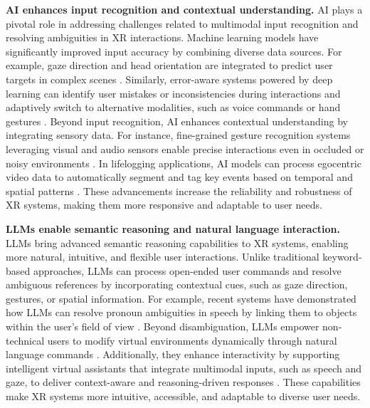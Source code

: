 \documentclass[review]{fcs}
\newcommand{\revise}[2]{\textcolor[rgb]{0,0,0}{#2}}
\begin{document}
\revise{}{\textbf{AI enhances input recognition and contextual understanding.}  AI plays a pivotal role in addressing challenges related to multimodal input recognition and resolving ambiguities in XR interactions. Machine learning models have significantly improved input accuracy by combining diverse data sources. For example, gaze direction and head orientation are integrated to predict user targets in complex scenes \cite{DBLP:conf/chi/WeiSYW0YL23}. Similarly, error-aware systems powered by deep learning can identify user mistakes or inconsistencies during interactions and adaptively switch to alternative modalities, such as voice commands or hand gestures \cite{DBLP:conf/uist/SendhilnathanZL22, DBLP:journals/tvcg/SidenmarkP0CGWG22}.  Beyond input recognition, AI enhances contextual understanding by integrating sensory data. For instance, fine-grained gesture recognition systems leveraging visual and audio sensors enable precise interactions even in occluded or noisy environments \cite{DBLP:conf/chi/XuZKN23}. In lifelogging applications, AI models can process egocentric video data to automatically segment and tag key events based on temporal and spatial patterns \cite{10484440}. These advancements increase the reliability and robustness of XR systems, making them more responsive and adaptable to user needs.} 

\revise{}{\textbf{LLMs enable semantic reasoning and natural language interaction.}  LLMs bring advanced semantic reasoning capabilities to XR systems, enabling more natural, intuitive, and flexible user interactions. Unlike traditional keyword-based approaches, LLMs can process open-ended user commands and resolve ambiguous references by incorporating contextual cues, such as gaze direction, gestures, or spatial information. For example, recent systems have demonstrated how LLMs can resolve pronoun ambiguities in speech by linking them to objects within the user’s field of view \cite{DBLP:journals/imwut/WangSWYYWJXY24, DBLP:conf/chi/0005WBCRF24}. Beyond disambiguation, LLMs empower non-technical users to modify virtual environments dynamically through natural language commands \cite{DBLP:conf/vr/GiunchiNGS24}. Additionally, they enhance interactivity by supporting intelligent virtual assistants that integrate multimodal inputs, such as speech and gaze, to deliver context-aware and reasoning-driven responses \cite{DBLP:conf/chi/WangYWJ024}. These capabilities make XR systems more intuitive, accessible, and adaptable to diverse user needs. }
\end{document}
